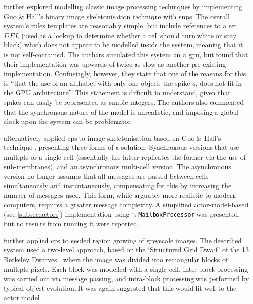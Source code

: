 \citeauthor{Diaz-Pernil2013a} \cite{Diaz-Pernil2013a} further explored modelling classic image processing techniques by implementing Guo \& Hall's binary image skeletonisation technique \cite{Guo1989} with \gls{snps}.  The overall system's rules templates are reasonably simple, but include references to a set \(DEL\) (used as a lookup to determine whether a cell should turn white or stay black) which does not appear to be modelled inside the system, meaning that it is not self-contained.  The authors simulated this system on a \gls{gpu}, but found that their implementation was upwards of twice as slow as another pre-existing implementation.  Confusingly, however, they state that one of the reasons for this is ``that the use of an alphabet with only one object, the spike \(a\), does not fit in the GPU architecture''.  This statement is difficult to understand, given that spikes can easily be represented as simple integers.  The authors also commented that the synchronous nature of the model is unrealistic, and imposing a global clock upon the system can be problematic.

\citeauthor{Nicolescu2014} \cite{Nicolescu2014} alternatively applied \gls{cps} to image skeletonisation based on Guo \& Hall's technique \cite{Guo1989}, presenting three forms of a solution: Synchronous versions that use multiple or a single cell (essentially the latter replicates the former via the use of sub-membranes), and an asynchronous multi-cell version.  The asynchronous version no longer assumes that all messages are passed between cells simultaneously and instantaneously, compensating for this by increasing the number of messages used.  This form, while arguably more realistic to modern computers, requires a greater message complexity. A simplified \gls{actor}-model-based (see \autoref{subsec:actors}) implementation using \fsharp{}'s \texttt{MailboxProcessor} \cite[ch.~11]{Syme2015a} was presented, but no results from running it were reported.

\citeauthor{Nicolescu2015a} \cite{Nicolescu2015a} further applied \gls{cps} to seeded region growing of greyscale images.  The described system used a two-level approach, based on the `Structured Grid Dwarf' of the 13 Berkeley Dwarves \cite{Asanovic2006}, where the image was divided into rectangular blocks of multiple pixels.  Each block was modelled with a single cell, inter-block processing was carried out via message passing, and intra-block processing was performed by typical object evolution.  It was again suggested that this would fit well to the \gls{actor} model.

